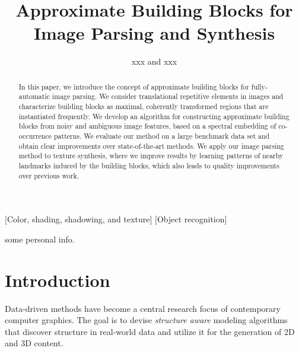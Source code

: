\documentclass{acmtog}
\begin{document}

\title{Approximate Building Blocks for Image Parsing and Synthesis} %

\author{xxx {\upshape and} xxx
}

[Color, shading, shadowing, and texture]
[Object recognition]




\maketitle

\begin{bottomstuff} 
some personal info.
\end{bottomstuff}

\begin{abstract} 
In this paper, we introduce the concept of approximate building blocks for fully-automatic image parsing. We consider translational repetitive elements in images and characterize building blocks as maximal, coherently transformed regions that are instantiated frequently. We develop an algorithm for constructing approximate building blocks from noisy and ambiguous image features, based on a spectral embedding of co-occurrence patterns. We evaluate our method on a large benchmark data set and obtain clear improvements over state-of-the-art methods. We apply our image parsing method to texture synthesis, where we improve results by learning patterns of nearby landmarks induced by the building blocks, which also leads to quality improvements over previous work.
\end{abstract}

\section{Introduction}
\label{sec:Introduction}

Data-driven methods have become a central research focus of contemporary computer graphics. The goal is to devise \emph{structure aware} modeling algorithms that discover structure in real-world data and utilize it for the generation of 2D and 3D content.
\end{document}
